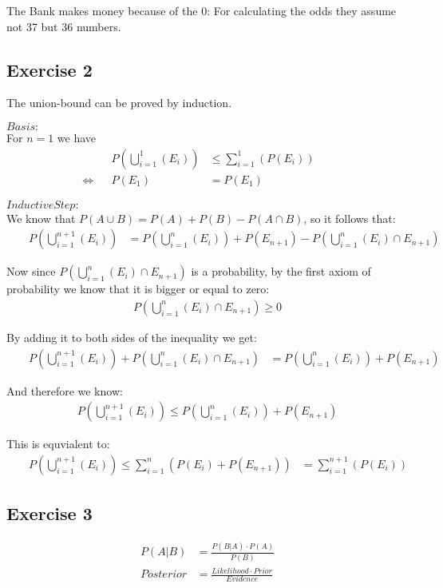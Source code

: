 { }

The Bank makes money because of the $0$: For calculating the odds they assume not 37 but 36 numbers.


\subsection*{Exercise 2}
The union-bound can be proved by induction.

$Basis:$ \\ For $n=1$ we have
\setcounter{equation}{0}
\begin{align}
& & P(\bigcup_{i=1}^{1}(E_i)) & \leq \sum_{i=1}^{1}(P(E_i)) & & \\
\Leftrightarrow & & P(E_1) & = P(E_1) & & 
\end{align}

$Inductive Step:$ \\
We know that $P(A \cup B) = P(A) + P(B) - P(A \cap B)$, so it follows that:
\begin{align}
& & P(\bigcup_{i=1}^{n+1}(E_i)) & = P(\bigcup_{i=1}^{n}(E_i)) + P(E_{n+1}) - P(\bigcup_{i=1}^{n}(E_i) \cap E_{n+1}) & &
\end{align}

Now since $P(\bigcup_{i=1}^{n}(E_i) \cap E_{n+1})$ is a probability, by the first axiom of probability we know that it is bigger or equal to zero:
\begin{align}
 P(\bigcup_{i=1}^{n}(E_i) \cap E_{n+1}) \geq 0 
\end{align}

By adding it to both sides of the inequality we get:
\begin{align}
& & P(\bigcup_{i=1}^{n+1}(E_i)) + P(\bigcup_{i=1}^{n}(E_i) \cap E_{n+1}) & = P(\bigcup_{i=1}^{n}(E_i)) + P(E_{n+1})  & &
\end{align}

And therefore we know:
\begin{align}
& & P(\bigcup_{i=1}^{n+1}(E_i)) \leq P(\bigcup_{i=1}^{n}(E_i)) + P(E_{n+1})  & &
\end{align}

This is equvialent to:
\begin{align}
& & P(\bigcup_{i=1}^{n+1}(E_i)) \leq \sum_{i=1}^{n}(P(E_i) + P(E_{n+1})) & = \sum_{i=1}^{n+1}(P(E_i)) & &
\end{align}
\setcounter{equation}{0}


\subsection*{Exercise 3}
\begin{align*}
P(A|B) & = \frac{P(B|A) \cdot P(A)}{P(B)} \\
Posterior & = \frac{Likelihood \cdot Prior}{Evidence}
\end{align*}

